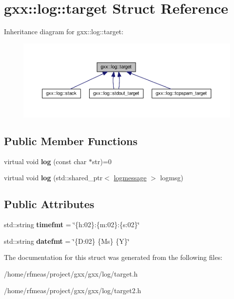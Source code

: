 \hypertarget{classgxx_1_1log_1_1target}{}\section{gxx\+:\+:log\+:\+:target Struct Reference}
\label{classgxx_1_1log_1_1target}


Inheritance diagram for gxx\+:\+:log\+:\+:target\+:
\nopagebreak
\begin{figure}[H]
\begin{center}
\leavevmode
\includegraphics[width=350pt]{classgxx_1_1log_1_1target__inherit__graph}
\end{center}
\end{figure}
\subsection*{Public Member Functions}
\begin{DoxyCompactItemize}
\item 
virtual void {\bfseries log} (const char $\ast$str)=0\hypertarget{classgxx_1_1log_1_1target_aacaa566ad432346ca6e169203f5cd09f}{}\label{classgxx_1_1log_1_1target_aacaa566ad432346ca6e169203f5cd09f}

\item 
virtual void {\bfseries log} (std\+::shared\+\_\+ptr$<$ \hyperlink{structgxx_1_1log_1_1logmessage}{logmessage} $>$ logmsg)\hypertarget{classgxx_1_1log_1_1target_a75049f056907db10a2a26d9e8e793c72}{}\label{classgxx_1_1log_1_1target_a75049f056907db10a2a26d9e8e793c72}

\end{DoxyCompactItemize}
\subsection*{Public Attributes}
\begin{DoxyCompactItemize}
\item 
std\+::string {\bfseries timefmt} = \char`\"{}\{h\+:02\}\+:\{m\+:02\}\+:\{s\+:02\}\char`\"{}\hypertarget{classgxx_1_1log_1_1target_a9ec6cafbb6f509002cb1fa118cbcc742}{}\label{classgxx_1_1log_1_1target_a9ec6cafbb6f509002cb1fa118cbcc742}

\item 
std\+::string {\bfseries datefmt} = \char`\"{}\{D\+:02\} \{Ms\} \{Y\}\char`\"{}\hypertarget{classgxx_1_1log_1_1target_ac291eef5912f351e5dc4bfaf922adfd3}{}\label{classgxx_1_1log_1_1target_ac291eef5912f351e5dc4bfaf922adfd3}

\end{DoxyCompactItemize}


The documentation for this struct was generated from the following files\+:\begin{DoxyCompactItemize}
\item 
/home/rfmeas/project/gxx/gxx/log/target.\+h\item 
/home/rfmeas/project/gxx/gxx/log/target2.\+h\end{DoxyCompactItemize}
